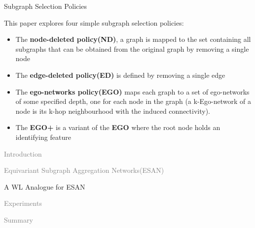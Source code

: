 \documentclass[aspectratio=169,mathserif]{beamer}  %
\newcommand{\light}[1]{\textcolor{gray}{#1}}
\newcommand{\tb}{\textbf}
\begin{document}
\begin{frame}{Subgraph Selection Policies}

This paper explores four simple subgraph selection policies: 
\begin{itemize}[<+->]
    \item The \tb{node-deleted policy(ND)}, a graph is mapped to the set containing all subgraphs that can be obtained from the original graph by removing a single node
    \item The \tb{edge-deleted policy(ED)} is defined by removing a single edge
    \item The \tb{ego-networks policy(EGO)} maps each graph to a set of ego-networks of some specified depth, one for each node in the graph (a k-Ego-network of a node is its k-hop neighbourhood with the induced connectivity).
    \item The \tb{EGO+} is a variant of the \tb{EGO} where the root node holds an identifying feature
\end{itemize}

\end{frame}



\begin{frame}[noframenumbering]
\begin{itemize}
    \begin{LARGE}
    \item \light{Introduction}
    \item \light{Equivariant Subgraph Aggregation Networks(ESAN)}
    \item A WL Analogue for ESAN
    \item \light{Experiments}
    \item \light{Summary}
    \end{LARGE}
\end{itemize}
\end{frame}
\end{document}
